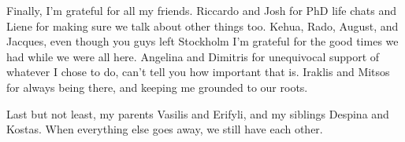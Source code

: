 \begin{acknowledgements}
Finally, I'm grateful for all my friends. Riccardo and Josh
for PhD life chats and Liene for making sure we talk about other things too.
Kehua, Rado, August, and Jacques, even though you guys left Stockholm I'm grateful for the
good times we had while we were all here. Angelina and Dimitris for unequivocal
support of whatever I chose to do, can't tell you how important that is.
Iraklis and Mitsos for always being there, and keeping me grounded to our
roots.

Last but not least, my parents Vasilis and Erifyli, and my siblings Despina and Kostas.
When everything else goes away, we still have each other.

\end{acknowledgements}
